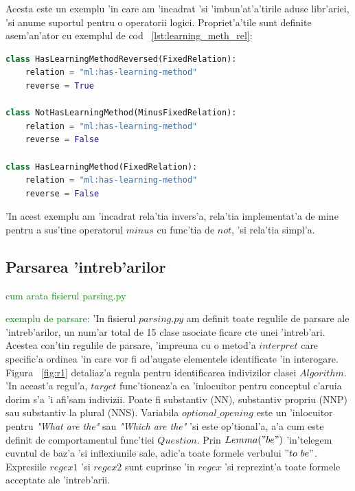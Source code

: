 \documentclass[12pt,a4paper,twoside]{report}
\begin{document}
Acesta este un exemplu 'in care am 'incadrat 'si 'imbun'at'a'tirile aduse libr'ariei, 'si anume suportul pentru o operatorii logici. Propriet'a'tile sunt definite asem'an'ator cu exemplul de cod ~\ref{lst:learning_meth_rel}:

\begin{lstlisting}[basicstyle=\footnotesize, language = Python, label = lst:learning_meth_rel, caption = Proprietatea has-learning-method]
class HasLearningMethodReversed(FixedRelation):
    relation = "ml:has-learning-method"
    reverse = True

class NotHasLearningMethod(MinusFixedRelation):
    relation = "ml:has-learning-method"
    reverse = False

class HasLearningMethod(FixedRelation):
    relation = "ml:has-learning-method"
    reverse = False

\end{lstlisting}

'In acest exemplu am 'incadrat rela'tia invers'a, rela'tia implementat'a de mine pentru a sus'tine operatorul $minus$ cu func'tia de $not$, 'si rela'tia simpl'a.


\subsection{Parsarea 'intreb'arilor}
\label{sec:parse}





\textcolor{green}{ cum arata fisierul parsing.py}

\textcolor{green}{exemplu de parsare: }
'In fisierul $parsing.py$ am definit toate regulile de parsare ale 'intreb'arilor, un num'ar total de 15 clase asociate ficare c\ia te unei 'intreb'ari. Acestea con'tin regulile de parsare, 'impreuna cu o metod'a $interpret$ care specific'a ordinea 'in care vor fi ad'augate elementele identificate 'in interogare.
Figura ~\ref{fig:r1} detaliaz'a regula pentru identificarea indivizilor clasei $Algorithm$. 'In aceast'a regul'a, $target$ func'tioneaz'a ca 'inlocuitor pentru conceptul c'aruia dorim s'a 'i afi'sam indivizii. Poate fi substantiv (NN), substantiv propriu (NNP) sau substantiv la plural (NNS). Variabila $optional\_opening$ este un 'inlocuitor pentru {\it"What are the"} sau {\it"Which are the"} 'si este op'tional'a, a'a cum este definit de comportamentul func'tiei $Question$. Prin $Lemma("be")$ 'in'telegem cuv\ia ntul de baz'a 'si inflexiunile sale, adic'a toate formele verbului $"to\ be"$.
Expresiile $regex1$ 'si $regex2$ sunt cuprinse 'in $regex$ 'si reprezint'a toate formele acceptate ale 'intreb'arii.
\end{document}
